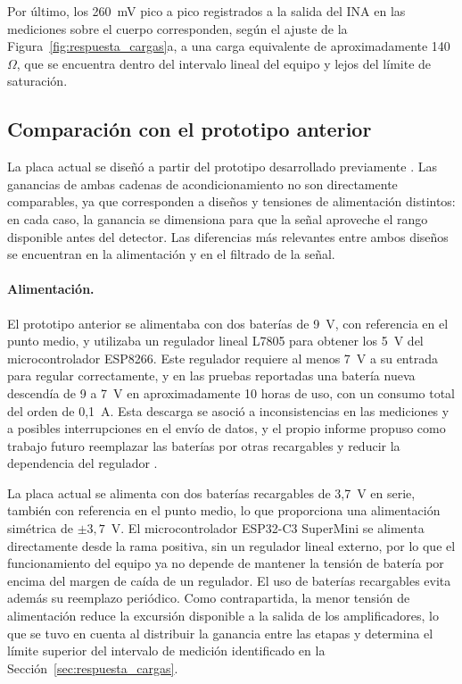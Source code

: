 \documentclass[12pt,a4paper]{article}
\begin{document}
Por último, los 260~mV pico a pico registrados a la salida del INA en las mediciones sobre el
cuerpo corresponden, según el ajuste de la Figura~\ref{fig:respuesta_cargas}a, a una carga
equivalente de aproximadamente 140~$\Omega$, que se encuentra dentro del intervalo lineal del
equipo y lejos del límite de saturación.

\subsection{Comparación con el prototipo anterior}
\label{sec:comparacion_prototipo}

La placa actual se diseñó a partir del prototipo desarrollado previamente \cite{informe_grupo2_2025}.
Las ganancias de ambas cadenas de acondicionamiento no son directamente comparables, ya que
corresponden a diseños y tensiones de alimentación distintos: en cada caso, la ganancia se
dimensiona para que la señal aproveche el rango disponible antes del detector. Las diferencias
más relevantes entre ambos diseños se encuentran en la alimentación y en el filtrado de la señal.

\paragraph{Alimentación.}
El prototipo anterior se alimentaba con dos baterías de 9~V, con referencia en el punto medio,
y utilizaba un regulador lineal L7805 para obtener los 5~V del microcontrolador ESP8266. Este
regulador requiere al menos 7~V a su entrada para regular correctamente, y en las pruebas
reportadas una batería nueva descendía de 9 a 7~V en aproximadamente 10 horas de uso, con un
consumo total del orden de 0,1~A. Esta descarga se asoció a inconsistencias en las mediciones
y a posibles interrupciones en el envío de datos, y el propio informe propuso como trabajo futuro
reemplazar las baterías por otras recargables y reducir la dependencia del regulador
\cite{informe_grupo2_2025}.

La placa actual se alimenta con dos baterías recargables de 3,7~V en serie, también con
referencia en el punto medio, lo que proporciona una alimentación simétrica de $\pm3{,}7$~V. El
microcontrolador ESP32-C3 SuperMini se alimenta directamente desde la rama positiva, sin un
regulador lineal externo, por lo que el funcionamiento del equipo ya no depende de mantener la
tensión de batería por encima del margen de caída de un regulador. El uso de baterías recargables
evita además su reemplazo periódico. Como contrapartida, la menor tensión de alimentación reduce
la excursión disponible a la salida de los amplificadores, lo que se tuvo en cuenta al distribuir
la ganancia entre las etapas y determina el límite superior del intervalo de medición
identificado en la Sección~\ref{sec:respuesta_cargas}.
\end{document}
